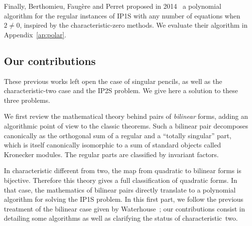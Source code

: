 \documentclass{lms}
\begin{document}
Finally, Berthomieu, Faugère and Perret
proposed in 2014~\cite{DBLP:journals/corr/BerthomieuFP13}
a polynomial algorithm for the regular instances of IP1S
with any number of equations when~$2 ≠ 0$,
inspired by the characteristic-zero methods.
We evaluate their algorithm in Appendix~\ref{ap:polar}.



\subsection*{Our contributions}

These previous works left open the case of singular pencils,
as well as the characteristic-two case
and the IP2S problem.
We give here a solution to these three problems.

We first review the mathematical theory behind pairs of \emph{bilinear} forms,
adding an algorithmic point of view to the classic theorems.
% 
Such a bilinear pair decomposes canonically as the orthogonal sum of
a regular and a ``totally singular'' part,
which is itself canonically isomorphic to a sum of standard objects
called Kronecker modules.
The regular parts are classified by invariant factors.

In characteristic different from two,
the map from quadratic to bilinear forms is bijective.
Therefore this theory gives a full classification of quadratic forms.
In that case, the mathematics of bilinear pairs
directly translate to a polynomial algorithm for solving the IP1S problem.
In this first part, we follow the previous treatment of
the bilinear case given by Waterhouse~\cite{inventiones1976waterhouse};
our contributions consist in detailing some algorithms
as well as clarifying the status of characteristic~two.
\end{document}
